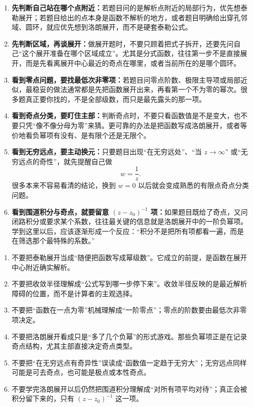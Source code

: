 \begin{tishi}[做题时的判断思路]
\begin{enumerate}
    \item \textbf{先判断自己站在哪个点附近：}若题目问的是解析点附近的局部行为，优先想泰勒展开；若题目给出的点本身是函数不解析的地方，或者题目明确给出穿孔邻域、圆环，就应优先想到洛朗展开，而不是硬套泰勒公式。

    \item \textbf{先判断区域，再谈展开：}做展开题时，不要只顾着把式子拆开，还要先问自己``这个展开准备在哪个区域成立''。尤其是分式函数，往往第一步不是直接展开，而是先看离展开中心最近的奇点在哪里，或者当前所在的是哪个圆环。

    \item \textbf{看到零点问题，要找最低次非零项：}若题目问零点阶数、极限主导项或局部近似，最稳妥的做法通常都是先把函数展开出来，再看第一个不为零的幂次。很多题真正要你找的，不是全部级数，而只是最先露头的那一项。

    \item \textbf{看到奇点分类，要盯住主部：}判断奇点时，不要只看函数值是不是变大，也不要只凭``像不像分母为零''来猜。更可靠的办法是把函数写成洛朗展开，或者等价地看负幂项有没有、是有限个还是无限个。

    \item \textbf{看到无穷远点，要主动换元：}只要题目出现``在无穷远处''、``当 $z\to\infty$'' 或``无穷远点的奇性''，就先提醒自己做
    \[
        w=\frac{1}{z}.
    \]
    很多本来不容易看清的结论，换到 $w=0$ 以后就会变成熟悉的有限点奇点分类问题。

    \item \textbf{看到围道积分与奇点，就要留意 $(z-z_0)^{-1}$ 项：}如果题目既给了奇点，又问闭路积分或要求某个系数，往往最关键的信息就是洛朗展开中的一阶负幂项。学到这里以后，应该逐渐形成一个反应：``积分不是把所有项都看一遍，而是在筛选那个最特殊的系数。''
\end{enumerate}
\end{tishi}

\begin{jinshi}[本章最容易混淆的地方]
\begin{enumerate}
    \item 不要把泰勒展开当成``随便把函数写成幂级数''。它成立的前提，是函数在展开中心附近确实解析。
    \item 不要把收敛半径理解成``公式写到哪一步停下来''。收敛半径反映的是最近解析障碍的位置，而不是计算者的主观选择。
    \item 不要把``函数在一点为零''机械理解成``一阶零点''；零点的阶数要由最低次非零项决定。
    \item 不要把洛朗展开看成只是``多了几个负幂''的形式游戏。那些负幂项正是在记录奇点结构，尤其主部直接决定奇点类型。
    \item 不要把``在无穷远点有奇异性''误读成``函数值一定趋于无穷大''；无穷远点同样可能是可去奇点，也可能是极点或本性奇点。
    \item 不要学完洛朗展开以后仍然把围道积分理解成``对所有项平均对待''；真正会被积分留下来的，只有 $(z-z_0)^{-1}$ 这一项。
\end{enumerate}
\end{jinshi}

